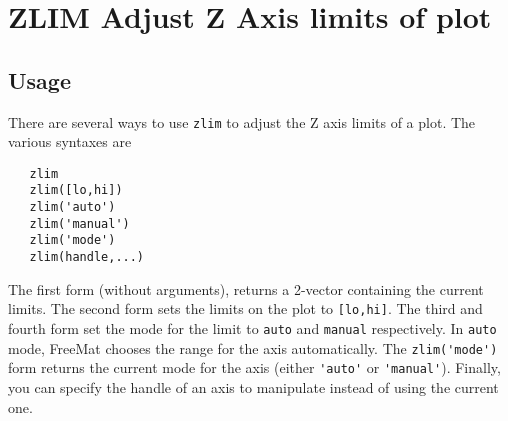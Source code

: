 \section{ZLIM Adjust Z Axis limits of plot}

\subsection{Usage}

There are several ways to use \verb|zlim| to adjust the Z axis limits of
a plot.  The various syntaxes are
\begin{verbatim}
   zlim
   zlim([lo,hi])   
   zlim('auto')
   zlim('manual')
   zlim('mode')
   zlim(handle,...)
\end{verbatim}
The first form (without arguments), returns a 2-vector containing the
current limits.  The second form sets the limits on the plot to \verb|[lo,hi]|.
The third and fourth form set the mode for the limit to \verb|auto| and \verb|manual|
respectively.  In \verb|auto| mode, FreeMat chooses the range for the axis 
automatically.  The \verb|zlim('mode')| form returns the current mode for the axis
(either \verb|'auto'| or \verb|'manual'|).  Finally, you can specify the handle of an
axis to manipulate instead of using the current one.
